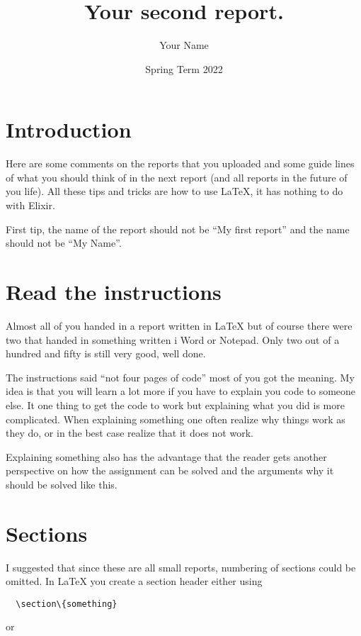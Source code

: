 \documentclass[a4paper,11pt]{article}
\begin{document}
\title{
    \textbf{Your second report.}
}
\author{Your Name}
\date{Spring Term 2022}

\maketitle

\section*{Introduction}

Here are some comments on the reports that you uploaded and some
guide lines of what you should think of in the next report (and all
reports in the future of you life). All these tips and tricks are how
to use \LaTeX, it has nothing to do with Elixir.

First tip, the name of the report should not be ``My first report''
and the name should not be ``My Name''.

\section*{Read the instructions}

Almost all of you handed in a report written in LaTeX but of course
there were two that handed in something written i Word or
Notepad. Only two out of a hundred and fifty is still very good, well done.

The instructions said ``not four pages of code'' most of you got the
meaning. My idea is that you will learn a lot more if you have to
explain you code to someone else. It one thing to get the code to work
but explaining what you did is more complicated. When explaining
something one often realize why things work as they do, or in the best
case realize that it does not work.

Explaining something also has the advantage that the reader gets
another perspective on how the assignment can be solved and the
arguments why it should be solved like this.

\section*{Sections}

I suggested that since these are all small reports, numbering of
sections could be omitted. In LaTeX you create a section header
either using

\begin{verbatim}
  \section\{something}
\end{verbatim}
or
\end{document}
